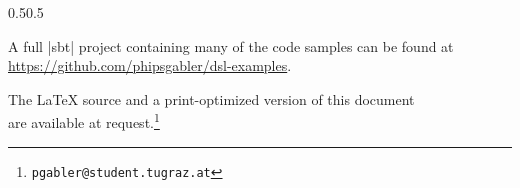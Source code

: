 \documentclass[11pt,a4paper,oneside]{memoir}
\begin{document}
\begin{adjustwidth}{\absleftindent}{\absrightindent}
  \vspace{2ex}
  
  \begin{adjustwidth}{0.5\absleftindent}{0.5\absrightindent}
    \begin{Center}
      A full |sbt| project containing many of the code samples can be found at
      \url{https://github.com/phipsgabler/dsl-examples}. 

      The \LaTeX{} source and a print-optimized version of this document \\
      are available at request.\footnote{\texttt{pgabler@student.tugraz.at}}
    \end{Center}
  \end{adjustwidth}
  

\end{adjustwidth}
\end{document}

